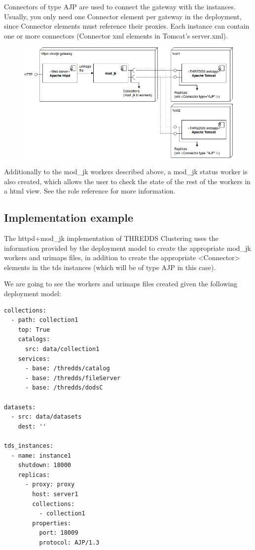 \documentclass[a4paper,12pt]{article}
\begin{document}
Connectors of type AJP are used to connect the gateway with the instances. Usually, you only need one Connector element per gateway in the deployment, since Connector elements must reference their proxies. Each instance can contain one or more connectors (Connector xml elements in Tomcat's server.xml).

\begin{figure}[h]
\includegraphics[width=1\textwidth]{images/jk-gateway.png}
\end{figure}

Additionally to the mod\_jk workers described above, a mod\_jk status worker is also created, which allows the user to check the state of the rest of the workers in a html view. See the role reference for more information.

\subsection{Implementation example}

The httpd+mod\_jk implementation of THREDDS Clustering uses the information provided by the deployment model to create the appropriate mod\_jk workers and urimaps files, in addition to create the appropriate <Connector> elements in the tds instances (which will be of type AJP in this case).

We are going to see the workers and urimaps files created given the following deployment model:

\begin{lstlisting}
collections:
  - path: collection1 
    top: True 
    catalogs:
      src: data/collection1
    services: 
      - base: /thredds/catalog
      - base: /thredds/fileServer
      - base: /thredds/dodsC

datasets:
  - src: data/datasets
    dest: '' 

tds_instances:
  - name: instance1
    shutdown: 18000
    replicas: 
      - proxy: proxy 
        host: server1
        collections: 
          - collection1
        properties: 
          port: 18009
          protocol: AJP/1.3
\end{lstlisting}
\end{document}
